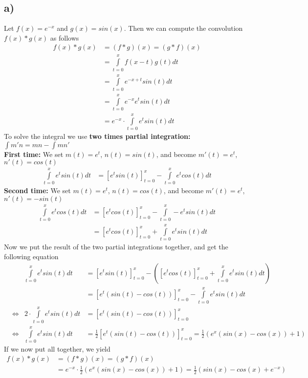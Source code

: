 \documentclass[a4paper]{article}
\begin{document}
    \subsection*{a)}
        Let $f(x) = e^{-x}$ and $g(x) = sin(x)$.
        Then we can compute the convolution $f(x) \ast g(x)$ as follows
        \begin{align}
            f(x) \ast g(x) &= (f \ast g)(x) = (g \ast f)(x)\\
            &= \int\limits_{t=0}^x f(x-t) g(t) dt\\
            &= \int\limits_{t=0}^x e^{-x+t} sin(t) dt\\
            &= \int\limits_{t=0}^x e^{-x} e^{t} sin(t) dt\\
            &= e^{-x} \cdot \int\limits_{t=0}^x e^{t} sin(t) dt
        \end{align}
        To solve the integral we use \textbf{two times partial integration:} $\int m'n = mn - \int mn'$\\
        \textbf{First time:} We set $m(t) = e^t$, $n(t) = sin(t)$, and become $m'(t) = e^t$, $n'(t) = cos(t)$
        \begin{align}
            \int\limits_{t=0}^x e^{t} sin(t) dt &= \left[ e^{t} sin(t) \right]_{t=0}^x - \int\limits_{t=0}^x e^{t} cos(t) dt
        \end{align}
        \textbf{Second time:} We set $m(t) = e^t$, $n(t) = cos(t)$, and become $m'(t) = e^t$, $n'(t) = -sin(t)$
        \begin{align}
            \int\limits_{t=0}^x e^{t} cos(t) dt &= \left[ e^{t} cos(t) \right]_{t=0}^x - \int\limits_{t=0}^x - e^{t} sin(t) dt\\
            &= \left[ e^{t} cos(t) \right]_{t=0}^x + \int\limits_{t=0}^x e^{t} sin(t) dt
        \end{align}
        Now we put the result of the two partial integrations together, and get the following equation
        \begin{align}
            & & \int\limits_{t=0}^x e^{t} sin(t) dt &= \left[ e^{t} sin(t) \right]_{t=0}^x - \left( \left[ e^{t} cos(t) \right]_{t=0}^x + \int\limits_{t=0}^x e^{t} sin(t) dt \right)\\
            & & &= \left[ e^{t} \left( sin(t) - cos(t) \right) \right]_{t=0}^x - \int\limits_{t=0}^x e^{t} sin(t) dt\\
            &\Leftrightarrow & 2 \cdot \int\limits_{t=0}^x e^{t} sin(t) dt &= \left[ e^{t} \left( sin(t) - cos(t) \right) \right]_{t=0}^x\\
            &\Leftrightarrow & \int\limits_{t=0}^x e^{t} sin(t) dt &= \frac{1}{2} \left[ e^{t} \left( sin(t) - cos(t) \right) \right]_{t=0}^x
            = \frac{1}{2} \left( e^{x} \left( sin(x) - cos(x) \right) + 1 \right)
        \end{align}
        If we now put all together, we yield
        \begin{align}
            f(x) \ast g(x) &= (f \ast g)(x) = (g \ast f)(x)\\
            &= e^{-x} \cdot \frac{1}{2} \left( e^{x} \left( sin(x) - cos(x) \right) + 1 \right)
            = \frac{1}{2} \left( sin(x) - cos(x) + e^{-x} \right)
        \end{align}
        
\end{document}
